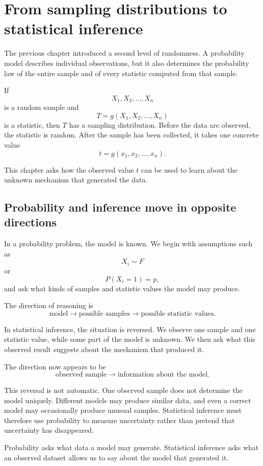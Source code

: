 \section{From sampling distributions to statistical inference}

The previous chapter introduced a second level of randomness. A probability model
describes individual observations, but it also determines the probability law of
the entire sample and of every statistic computed from that sample.

If
\[
X_1,X_2,\ldots,X_n
\]
is a random sample and
\[
T=g(X_1,X_2,\ldots,X_n)
\]
is a statistic, then \(T\) has a sampling distribution. Before the data are
observed, the statistic is random. After the sample has been collected, it takes
one concrete value
\[
t=g(x_1,x_2,\ldots,x_n).
\]

This chapter asks how the observed value \(t\) can be used to learn about the
unknown mechanism that generated the data.

\subsection*{Probability and inference move in opposite directions}

In a probability problem, the model is known. We begin with assumptions such as
\[
X_i\sim F
\]
or
\[
P(X_i=1)=p,
\]
and ask what kinds of samples and statistic values the model may produce.

The direction of reasoning is
\[
\text{model}
\longrightarrow
\text{possible samples}
\longrightarrow
\text{possible statistic values}.
\]

In statistical inference, the situation is reversed. We observe one sample and
one statistic value, while some part of the model is unknown. We then ask what
this observed result suggests about the mechanism that produced it.

The direction now appears to be
\[
\text{observed sample}
\longrightarrow
\text{information about the model}.
\]

This reversal is not automatic. One observed sample does not determine the model
uniquely. Different models may produce similar data, and even a correct model may
occasionally produce unusual samples. Statistical inference must therefore use
probability to measure uncertainty rather than pretend that uncertainty has
disappeared.

\begin{summarybox}
Probability asks what data a model may generate. Statistical inference asks what
an observed dataset allows us to say about the model that generated it.
\end{summarybox}

